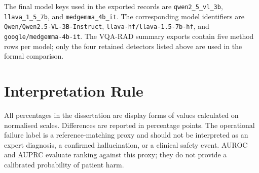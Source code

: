 The final model keys used in the exported records are \texttt{qwen2\_5\_vl\_3b}, \texttt{llava\_1\_5\_7b}, and \texttt{medgemma\_4b\_it}. The corresponding model identifiers are \texttt{Qwen/Qwen2.5-VL-3B-Instruct}, \texttt{llava-hf/llava-1.5-7b-hf}, and \texttt{google/medgemma-4b-it}. The VQA-RAD summary exports contain five method rows per model; only the four retained detectors listed above are used in the formal comparison.

\section*{Interpretation Rule}

All percentages in the dissertation are display forms of values calculated on normalised scales. Differences are reported in percentage points. The operational failure label is a reference-matching proxy and should not be interpreted as an expert diagnosis, a confirmed hallucination, or a clinical safety event. AUROC and AUPRC evaluate ranking against this proxy; they do not provide a calibrated probability of patient harm.

